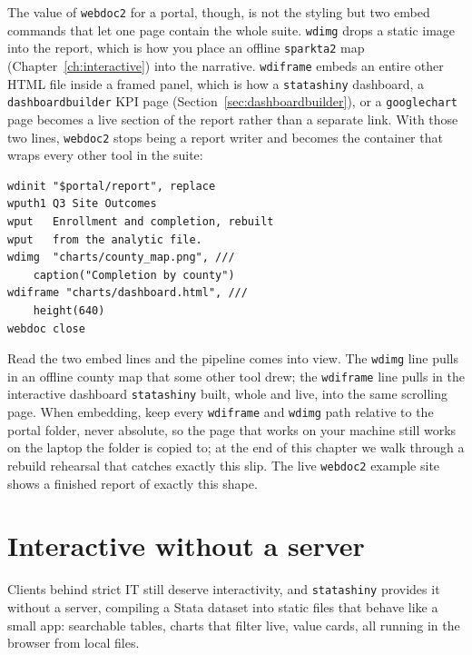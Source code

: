 The value of \texttt{webdoc2} for a portal, though, is not the styling but two embed commands that let one page contain the whole suite. \texttt{wdimg} drops a static image into the report, which is how you place an offline \texttt{sparkta2} map (Chapter~\ref{ch:interactive}) into the narrative. \texttt{wdiframe} embeds an entire other HTML file inside a framed panel, which is how a \texttt{statashiny} dashboard, a \texttt{dashboardbuilder} KPI page (Section~\ref{sec:dashboardbuilder}), or a \texttt{googlechart} page becomes a live section of the report rather than a separate link. With those two lines, \texttt{webdoc2} stops being a report writer and becomes the container that wraps every other tool in the suite:
\par
{\footnotesize
\begin{verbatim}
wdinit "$portal/report", replace
wputh1 Q3 Site Outcomes
wput   Enrollment and completion, rebuilt
wput   from the analytic file.
wdimg  "charts/county_map.png", ///
    caption("Completion by county")
wdiframe "charts/dashboard.html", ///
    height(640)
webdoc close
\end{verbatim}
}
Read the two embed lines and the pipeline comes into view. The \texttt{wdimg} line pulls in an offline county map that some other tool drew; the \texttt{wdiframe} line pulls in the interactive dashboard \texttt{statashiny} built, whole and live, into the same scrolling page. When embedding, keep every \texttt{wdiframe} and \texttt{wdimg} path relative to the portal folder, never absolute, so the page that works on your machine still works on the laptop the folder is copied to; at the end of this chapter we walk through a rebuild rehearsal that catches exactly this slip. The live \texttt{webdoc2} example site shows a finished report of exactly this shape.

\section{Interactive without a server}
Clients behind strict IT still deserve interactivity, and \texttt{statashiny} provides it without a server, compiling a Stata dataset into static files that behave like a small app: searchable tables, charts that filter live, value cards, all running in the browser from local files.

